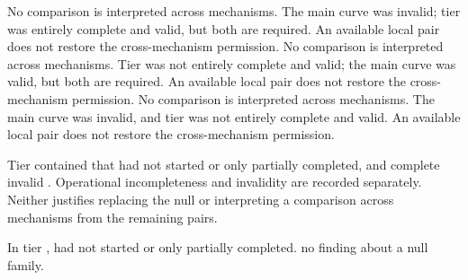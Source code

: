 No comparison is interpreted across mechanisms. The main curve was invalid; tier  was entirely complete and valid, but both are required. An available local pair does not restore the cross-mechanism permission. %
No comparison is interpreted across mechanisms. Tier  was not entirely complete and valid; the main curve was valid, but both are required. An available local pair does not restore the cross-mechanism permission. %
No comparison is interpreted across mechanisms. The main curve was invalid, and tier  was not entirely complete and valid. An available local pair does not restore the cross-mechanism permission. %

Tier  contained   that had not started or  only partially completed, and  complete invalid . %
Operational incompleteness and invalidity are recorded separately. Neither justifies replacing the null or interpreting a comparison across mechanisms from the remaining pairs. %

In tier ,   had not started or  only partially completed.  no finding about a null family. %

